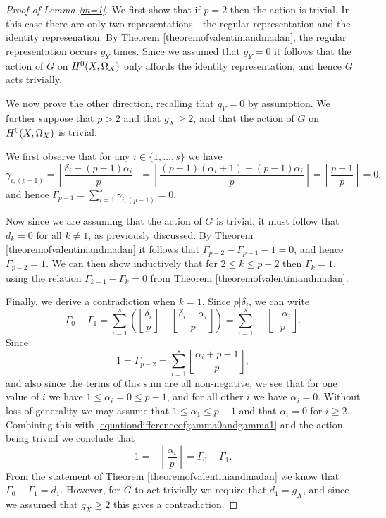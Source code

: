     \begin{proof}[Proof of Lemma \ref{m=1}]
    We first show that if $p=2$ then the action is trivial.
    In this case there are only two representations - the regular representation and the identity represenation.
    By Theorem \ref{theoremofvalentiniandmadan}, the regular representation occurs $g_Y$ times.
    Since we assumed that $g_Y = 0$ it follows that the action of $G$ on ${H^0(X,\Omega_X)}$ only affords the identity representation, and hence $G$ acts trivially.
    
    We now prove the other direction, recalling that $g_Y= 0$ by assumption.
    We further suppose that $p >2$ and that $g_X  \geq 2$, and that the action of $G$ on ${H^0(X,\Omega_X)}$ is trivial.
    
    We first observe that for any $i \in \{1, \ldots, s \}$ we have
        \[
        \gamma_{i, (p-1)} = \left \lfloor \frac{\delta_i - (p-1)\alpha_i}{p} \right \rfloor  = \left \lfloor \frac{(p-1)(\alpha_i + 1) - (p-1)\alpha_i}{p} \right \rfloor  = \left \lfloor \frac{p-1}{p} \right \rfloor = 0.
        \]  
    and hence $\Gamma_{p-1} = \sum_{ i=1}^s \gamma_{i, (p-1)} = 0$.

    Now since we are assuming that the action of $G$ is trivial, it must follow that $d_k = 0$ for all $k \neq 1$, as previously discussed.
    By Theorem \ref{theoremofvalentiniandmadan} it follows that $\Gamma_{p-2} - \Gamma_{p-1} -1 = 0$, and hence $\Gamma_{p-2} = 1$.
    We can then show inductively that for $2 \leq k \leq p-2$ then $\Gamma_k = 1$, using the relation $\Gamma_{k-1} - \Gamma_k = 0$ from Theorem \ref{theoremofvalentiniandmadan}.

    Finally, we derive a contradiction when $k =1$.
    Since $p | \delta_i$, we can write 
        \begin{equation}\label{equationdifferenceofgamma0andgamma1}
        \Gamma_0  - \Gamma_1 = \sum_{i=1}^s \left( \left \lfloor \frac{\delta_i}{p} \right \rfloor - \left \lfloor \frac{\delta_i - \alpha_i}{p} \right \rfloor \right) = \sum_{i=1}^s -\left\lfloor \frac{-\alpha_i}{p} \right \rfloor.
        \end{equation}
    Since
        \[
        1 = \Gamma_{p-2} = \sum_{i=1}^s \left\lfloor \frac{\alpha_i + p -1}{p} \right \rfloor,
        \]
    and also since the terms of this sum are all non-negative, we see that for one value of $i$ we have $1 \leq \alpha_i=0 \leq p-1$, and for all other $i$ we have $\alpha_i = 0$.
    Without loss of generality we may assume that $ 1 \leq \alpha_1 \leq p-1$ and that $\alpha_i = 0$ for $i\geq 2$.
    Combining this with \eqref{equationdifferenceofgamma0andgamma1} and the action being trivial we conclude that
        \[
        1 = - \left \lfloor \frac{\alpha_i}{p} \right \rfloor = \Gamma_0 - \Gamma_1. 
        \]  
    From the statement of Theorem \ref{theoremofvalentiniandmadan} we know that $\Gamma_0 - \Gamma_1 = d_1$.
    However, for $G$ to act trivially we require that $d_1 = g_X$, and since we assumed that $g_X \geq 2$ this gives a contradiction.
    \end{proof}


